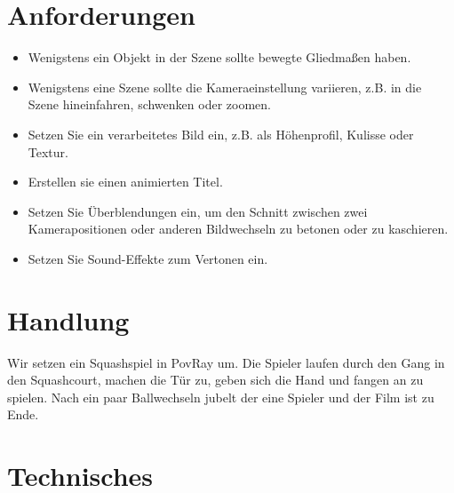 \section{Anforderungen}
\begin{itemize}
	\item Wenigstens ein Objekt in der Szene sollte bewegte Gliedmaßen haben.
	\item Wenigstens eine Szene sollte die Kameraeinstellung variieren, z.B. in die Szene hineinfahren, schwenken oder zoomen.
	\item Setzen Sie ein verarbeitetes Bild ein, z.B. als Höhenprofil, Kulisse oder Textur.
	\item Erstellen sie einen animierten Titel.
	\item Setzen Sie Überblendungen ein, um den Schnitt zwischen zwei Kamerapositionen oder anderen Bildwechseln zu betonen oder zu kaschieren.
	\item Setzen Sie Sound-Effekte zum Vertonen ein.
\end{itemize}
%
\section{Handlung}
Wir setzen ein Squashspiel in PovRay um. Die Spieler laufen durch den Gang in den Squashcourt, machen die Tür zu, geben sich die Hand und fangen an zu spielen. Nach ein paar Ballwechseln jubelt der eine Spieler und der Film ist zu Ende.
%
\section{Technisches}
